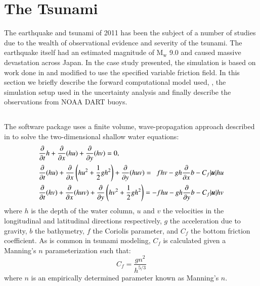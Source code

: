 
\section{The \tohoku Tsunami} 
\label{sec:tohoku}

The \tohoku earthquake and tsunami of 2011 has been the subject of a number of
studies due to the wealth of observational evidence and severity of the tsunami.
The earthquake itself had an estimated magnitude of $\text{M}_\text{w}$ 9.0 and
caused massive devastation across Japan.  In the case study presented, the
simulation is based on work done in \cite{MacInnes:2013cr} and modified to use
the specified variable friction field. In this section we briefly describe the
forward computational model used, \geoclaw, the  simulation setup used in the
uncertainty analysis and finally describe the observations from NOAA DART buoys.

\subsection{\geoclaw} \label{ssub:geoclaw}
The \geoclaw software package uses a finite volume, wave-propagation approach described in \cite{LeVeque:1997eg} to solve the two-dimensional shallow water equations:
\begin{equation} \label{eq:swe}
    \begin{aligned}
    &\pd{}{t} h + \pd{}{x} (hu) + \pd{}{y} (hv) = 0, \\
    &\pd{}{t}(hu) + \pd{}{x} \left(hu^2 + \frac{1}{2} g h^2 \right ) + \pd{}{y} (huv) = ~~ fhv - gh \pd{}{x} b - C_f |\vec{u}| hu \\
    &\pd{}{t} (hv) + \pd{}{x} (huv) + \pd{}{y} \left (hv^2 + \frac{1}{2} gh^2 \right) = -fhu - gh \pd{}{y} b - C_f |\vec{u}| hv
    \end{aligned}
\end{equation}
where $h$ is the depth of the water column, $u$ and $v$ the velocities in the 
longitudinal and latitudinal directions respectively, $g$ the acceleration due 
to gravity, $b$ the bathymetry, $f$ the Coriolis parameter, and $C_f$ the bottom 
friction coefficient.  As is common in tsunami modeling, $C_f$ is calculated 
given a Manning's $n$ parameterization such that:
\begin{equation}
    C_f = \frac{g n^2}{h^{5/3}}
\label{eq:coef}
\end{equation}
where $n$ is an empirically determined parameter known as Manning's $n$.  

